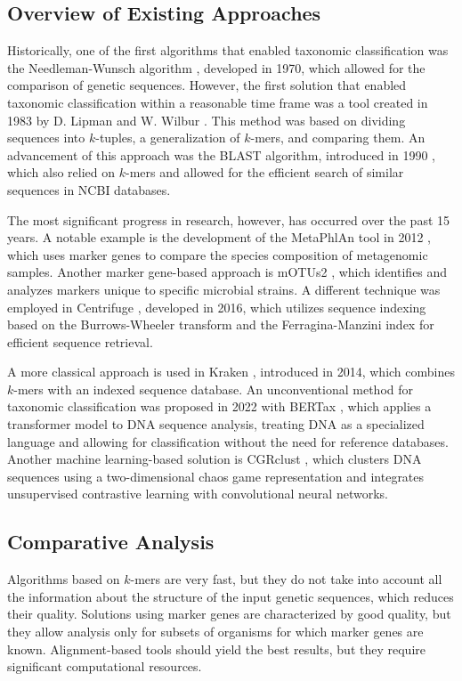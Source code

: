 \documentclass[pdflatex,sn-vancouver-num]{sn-jnl}%
\begin{document}
            \subsection{Overview of Existing Approaches}
                Historically, one of the first algorithms that enabled taxonomic classification was the Needleman-Wunsch algorithm \cite{Needleman:1970}, developed in 1970, which allowed for the comparison of genetic sequences. However, the first solution that enabled taxonomic classification within a reasonable time frame was a tool created in 1983 by D. Lipman and W. Wilbur \cite{Wilbur:1983}. This method was based on dividing sequences into $k$-tuples, a generalization of $k$-mers, and comparing them. An advancement of this approach was the BLAST algorithm, introduced in 1990 \cite{Altschul:1990}, which also relied on $k$-mers and allowed for the efficient search of similar sequences in NCBI databases.

                The most significant progress in research, however, has occurred over the past 15 years. A notable example is the development of the MetaPhlAn tool in 2012 \cite{Segata:2012}, which uses marker genes to compare the species composition of metagenomic samples. Another marker gene-based approach is mOTUs2 \cite{Milanese:2019}, which identifies and analyzes markers unique to specific microbial strains. A different technique was employed in Centrifuge \cite{Kim:2016}, developed in 2016, which utilizes sequence indexing based on the Burrows-Wheeler transform \cite{Burrows:1994} and the Ferragina-Manzini index \cite{Ferragina:2000} for efficient sequence retrieval.
            
                A more classical approach is used in Kraken \cite{Wood:2014}, introduced in 2014, which combines $k$-mers with an indexed sequence database. An unconventional method for taxonomic classification was proposed in 2022 with BERTax \cite{Mock:2022}, which applies a transformer model \cite{Transformers} to DNA sequence analysis, treating DNA as a specialized language and allowing for classification without the need for reference databases. Another machine learning-based solution is CGRclust \cite{Alipour:2024}, which clusters DNA sequences using a two-dimensional chaos game representation and integrates unsupervised contrastive learning with convolutional neural networks.

            \subsection{Comparative Analysis}
                Algorithms based on $k$-mers are very fast, but they do not take into account all the information about the structure of the input genetic sequences, which reduces their quality. Solutions using marker genes are characterized by good quality, but they allow analysis only for subsets of organisms for which marker genes are known. Alignment-based tools should yield the best results, but they require significant computational resources.
\end{document}
